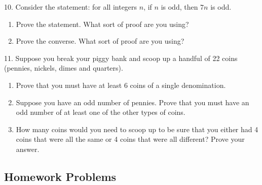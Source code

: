 \documentclass[10pt,]{book}
\theoremstyle{plain}
\theoremstyle{definition}
\theoremstyle{definition}
\theoremstyle{definition}
\numberwithin{equation}{chapter}
\begin{document}
\begin{exerciselist}
\begin{enumerate}[label=(\alph*)]
\end{enumerate}
\par\smallskip
\item[10.]\hypertarget{exercise-253}{}
            Consider the statement: for all integers \(n\), if \(n\) is odd, then \(7n\) is odd.
\leavevmode%
\begin{enumerate}[label=(\alph*)]
\item\hypertarget{li-1171}{}
                Prove the statement. What sort of proof are you using?
\item\hypertarget{li-1172}{}
                Prove the converse. What sort of proof are you using?
\end{enumerate}
\par\smallskip
\item[11.]\hypertarget{exercise-254}{}
            Suppose you break your piggy bank and scoop up a handful of 22 coins (pennies, nickels, dimes and quarters).
\leavevmode%
\begin{enumerate}[label=(\alph*)]
\item\hypertarget{li-1175}{}
                Prove that you must have at least 6 coins of a single denomination.
\item\hypertarget{li-1176}{}
                Suppose you have an odd number of pennies. Prove that you must have an odd number of at least one of the other types of coins.
\item\hypertarget{li-1177}{}
                How many coins would you need to scoop up to be sure that you either had 4 coins that were all the same or 4 coins that were all different? Prove your answer.
\end{enumerate}
\par\smallskip
\end{exerciselist}
\typeout{************************************************}
\typeout{************************************************}
\subsection[Homework Problems]{Homework Problems}\label{exercises-24}
\end{document}
